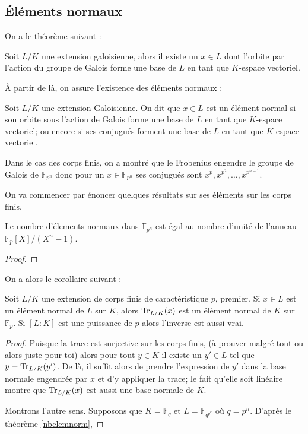 \documentclass[a4paper]{article} %
\numberwithin{section}{part}
\numberwithin{equation}{section}
\newcommand\GF[1]{\mathbb{F}_{#1}}
\begin{document}
\subsection{Éléments normaux}
\label{secelemnorm}
On a le théorème suivant :
\begin{thm}
Soit $L/K$ une extension galoisienne, alors il existe un $x\in L$ dont l'orbite
par l'action du groupe de Galois forme une base de $L$ en tant que $K$-espace
vectoriel.
\end{thm}
À partir de là, on assure l'existence des éléments normaux :

\begin{defn}
Soit $L/K$ une extension Galoisienne. On dit que $x\in L$ est un élément normal
si son orbite sous l'action de Galois forme une base de $L$ en tant que
$K$-espace vectoriel; ou encore si ses conjugués forment une base de $L$ en tant
que $K$-espace vectoriel.
\end{defn}
Dans le cas des corps finis, on a montré que le Frobenius engendre le groupe de
Galois de $\GF{p^n}$ donc pour un $x\in\GF{p^n}$ ses conjugués sont $x^p,
x^{p^2},\dots,x^{p^{n-1}}$.\par
On va commencer par énoncer quelques résultats sur ses éléments sur les corps
finis.

\begin{thm}
\label{nbelemnorm}
Le nombre d'élements normaux dans $\GF{p^n}$ est égal au nombre d'unité de
l'anneau $\GF{p}[X]/(X^n - 1)$.
\end{thm}
\begin{proof}
\end{proof}

On a alors le corollaire suivant :
\begin{cor}
Soit $L/K$ une extension de corps finis de caractéristique $p$, premier. Si
$x\in L$ est un élément normal de $L$ sur $K$, alors $\textup{Tr}_{L/K}(x)$ est 
un élément normal de $K$ sur $\GF{p}$. Si $[L:K]$ est une puissance de $p$ alors
l'inverse est aussi vrai.
\end{cor}
\begin{proof}
Puisque la trace est surjective sur les corps finis, (à prouver malgré tout ou
alors juste pour toi) alors pour tout $y\in K$ il existe un $y'\in L$ tel que $y
= \textup{Tr}_{L/K}(y')$. De là, il suffit alors de prendre l'expression de $y'$
dans la base normale engendrée par $x$ et d'y appliquer la trace; le fait
qu'elle soit linéaire montre que $\textup{Tr}_{L/K}(x)$ est aussi une base 
normale de $K$.\par
Montrons l'autre sens. Supposons que $K = \GF{q}$ et $L = \GF{q^{p^k}}$ où $q
= p^n$. D'après le théorème \ref{nbelemnorm},
\end{proof}
\end{document}
